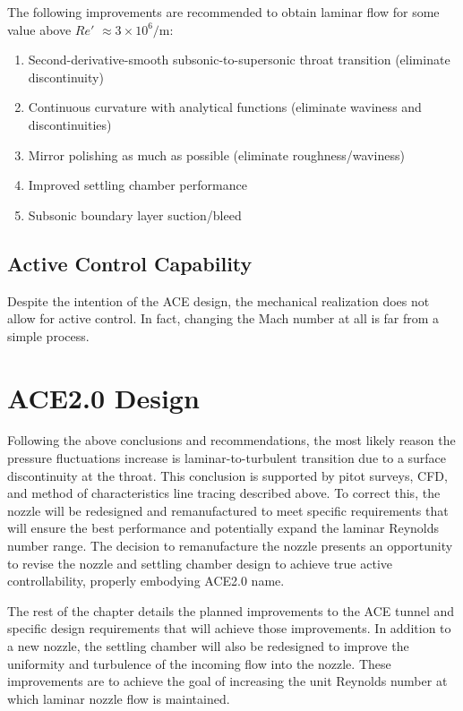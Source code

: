 The following improvements are recommended to obtain laminar flow for some value above $Re'$ $\approx 3 \times 10^6/\mathrm{m}$:
\begin{enumerate}
    \item Second-derivative-smooth subsonic-to-supersonic throat transition (eliminate discontinuity)
    \item Continuous curvature with analytical functions (eliminate waviness and discontinuities)
    \item Mirror polishing as much as possible (eliminate roughness/waviness)
    \item Improved settling chamber performance
    \item Subsonic boundary layer suction/bleed
\end{enumerate}

\subsection{Active Control Capability}

Despite the intention of the ACE design, the mechanical realization does not allow for active control. In fact, changing the Mach number at all is far from a simple process. 

\section{ACE2.0 Design}

Following the above conclusions and recommendations, the most likely reason the pressure fluctuations increase is laminar-to-turbulent transition due to a surface discontinuity at the throat. This conclusion is supported by pitot surveys, CFD, and method of characteristics line tracing described above. To correct this, the nozzle will be redesigned and remanufactured to meet specific requirements that will ensure the best performance and potentially expand the laminar Reynolds number range. The decision to remanufacture the nozzle presents an opportunity to revise the nozzle and settling chamber design to achieve true active controllability, properly embodying ACE2.0 name.

The rest of the chapter details the planned improvements to the ACE tunnel and specific design requirements that will achieve those improvements. In addition to a new nozzle, the settling chamber will also be redesigned to improve the uniformity and turbulence of the incoming flow into the nozzle. These improvements are to achieve the goal of increasing the unit Reynolds number at which laminar nozzle flow is maintained.

